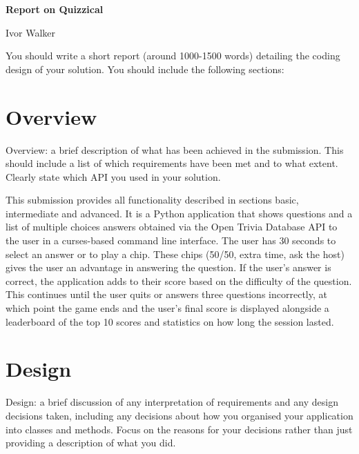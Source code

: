\documentclass[12pt]{article}
\begin{document}
\begin{titlepage}
    \centering
    \vspace*{\fill}

    {\Huge \textbf{Report on Quizzical} \par}    
    \vspace{1cm}
    {\Large Ivor Walker\par}      
    \vspace{1cm}
    
    \vspace*{\fill}
\end{titlepage}

You should write a short report (around 1000-1500 words) detailing the coding design of your solution. You should include the following sections:

\section{Overview}
Overview: a brief description of what has been achieved in the submission. This should include a list of which requirements have been met and to what extent. Clearly state which API you used in your solution.

This submission provides all functionality described in sections basic, intermediate and advanced. It is a Python application that shows questions and a list of multiple choices answers obtained via the Open Trivia Database API to the user in a curses-based command line interface. The user has 30 seconds to select an answer or to play a chip. These chips (50/50, extra time, ask the host) gives the user an advantage in answering the question. If the user's answer is correct, the application adds to their score based on the difficulty of the question. This continues until the user quits or answers three questions incorrectly, at which point the game ends and the user's final score is displayed alongside a leaderboard of the top 10 scores and statistics on how long the session lasted.

\section{Design}
Design: a brief discussion of any interpretation of requirements and any design decisions taken, including any decisions about how you organised your application into classes and methods. Focus on the reasons for your decisions rather than just providing a description of what you did.
\end{document}
